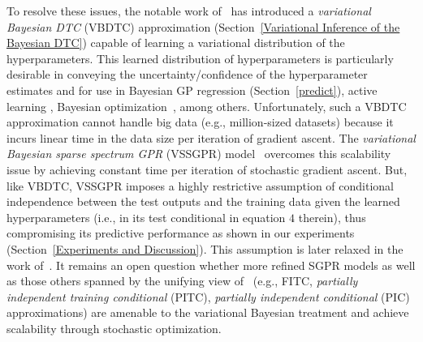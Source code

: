 \documentclass[conference]{IEEEtran}
\begin{document}
	To resolve these issues, the notable work of~\cite{Titsias13} has introduced a \emph{variational Bayesian DTC} (VBDTC) approximation (Section~\ref{Variational Inference of the Bayesian DTC}) capable of learning a variational distribution of the hyperparameters.
	This learned distribution of hyperparameters is particularly desirable in conveying the uncertainty/confidence of the hyperparameter estimates and for use in Bayesian GP regression (Section~\ref{predict}), active learning \cite{LowAAMAS13,NghiaICML14,LowAAMAS08,LowICAPS09,LowAAMAS11,LowAAMAS14,YehongAAAI16}, Bayesian optimization~\cite{Erik17,Ghahramani14,NghiaAAAI18,ling16}, among others.
Unfortunately, such a VBDTC approximation cannot handle big data (e.g., million-sized datasets) because it incurs linear time in the data size per iteration of gradient ascent. The  \emph{variational Bayesian sparse spectrum GPR} (VSSGPR) model~\cite{Gal2015Improving} overcomes this scalability issue by achieving constant time per iteration of stochastic gradient ascent. But, like VBDTC, VSSGPR imposes a highly restrictive assumption of conditional independence between the test outputs and the training data given the learned hyperparameters (i.e., in its test conditional in equation $4$ therein), thus compromising its predictive performance as shown in our experiments (Section~\ref{Experiments and Discussion}). 
This assumption is later relaxed in the work of~\cite{MinhAAAI17}.
It remains an open question whether more refined SGPR models as well as those others spanned by the unifying view of~\cite{candela05} (e.g., FITC, \emph{partially independent training conditional} (PITC), \emph{partially independent conditional} (PIC) \cite{Snelson07a} approximations) are amenable to the variational Bayesian treatment and achieve scalability through stochastic optimization.%
		
\end{document}

